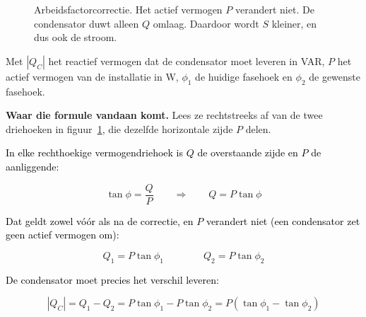 \documentclass[a4paper,11pt]{article}
\newcommand{\stapreden}[1]{\par\vspace{1.4mm}\noindent\textcolor{black}{#1}\par\vspace{-2mm}}
\begin{document}
\begin{figure}[H]
    \centering
    \caption{Arbeidsfactorcorrectie. Het actief vermogen $P$ verandert niet. De condensator duwt
        alleen $Q$ omlaag. Daardoor wordt $S$ kleiner, en dus ook de stroom.}
    \label{fig:pf-correctie}
\end{figure}
\FloatBarrier

{Met $|Q_C|$ het reactief vermogen dat de condensator moet leveren in VAR, $P$ het actief vermogen
    van de installatie in W, $\phi_1$ de huidige fasehoek en $\phi_2$ de gewenste fasehoek.}

\textbf{Waar die formule vandaan komt.} Lees ze rechtstreeks af van de twee driehoeken in
figuur~\ref{fig:pf-correctie}, die dezelfde horizontale zijde $P$ delen.

\stapreden{In elke rechthoekige vermogendriehoek is $Q$ de overstaande zijde en $P$ de aanliggende:}
\[\tan\phi = \frac{Q}{P} \qquad\Longrightarrow\qquad Q = P\tan\phi\]

\stapreden{Dat geldt zowel vóór als na de correctie, en $P$ verandert niet (een condensator zet geen actief vermogen om):}
\[Q_1 = P\tan\phi_1 \qquad\qquad Q_2 = P\tan\phi_2\]

\stapreden{De condensator moet precies het verschil leveren:}
\[|Q_C| = Q_1 - Q_2 = P\tan\phi_1 - P\tan\phi_2 = \boxed{P\left(\tan\phi_1 - \tan\phi_2\right)}\]
\end{document}
